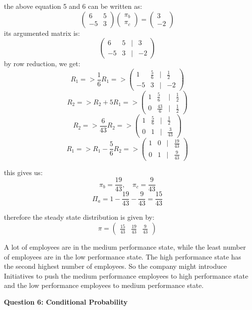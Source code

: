 \documentclass{article}
\begin{document}
the above equation 5 and 6 can be written as:
\[\begin{pmatrix}6&5\\-5&3\end{pmatrix}\begin{pmatrix}\pi_b\\\pi_c\end{pmatrix} = \begin{pmatrix}3\\-2\end{pmatrix}\]
its argumented matrix is:
\[\begin{pmatrix}6&5&|&3\\-5&3&|&-2\end{pmatrix}\]
by row reduction, we get:
\[R_1 => \frac{1}{6}R_1 => \begin{pmatrix}1&\frac{5}{6}&|&\frac{1}{2}\\-5&3&|&-2\end{pmatrix}\]
\[R_2 => R_2 + 5R_1 => \begin{pmatrix}1&\frac{5}{6}&|&\frac{1}{2}\\0&\frac{43}{6}&|&\frac{1}{2}\end{pmatrix}\]
\[R_2 => \frac{6}{43}R_2 => \begin{pmatrix}1&\frac{5}{6}&|&\frac{1}{2}\\0&1&|&\frac{3}{43}\end{pmatrix}\]
\[R_1 => R_1 - \frac{5}{6}R_2 => \begin{pmatrix}1&0&|&\frac{19}{43}\\0&1&|&\frac{9}{43}\end{pmatrix}\]

this gives us:
\[\pi_b = \frac{19}{43}, \quad \pi_c = \frac{9}{43}\]
\[\Pi_a = 1 - \frac{19}{43} - \frac{9}{43} = \frac{15}{43}\]

therefore the steady state distribution is given by:
\[\pi = \begin{pmatrix}\frac{15}{43}&\frac{19}{43}&\frac{9}{43}\end{pmatrix}\]


A lot of employees are in the medium performance state, while the least number of employees are in the low performance state. The high performance state has the second highest number of employees. So the company might introduce Initiatives to push the medium performance employees to high performance state and the low performance employees to medium performance state.

\begin{center}
    \large \textbf{Question 6: Conditional Probability}
\end{center}
\end{document}
